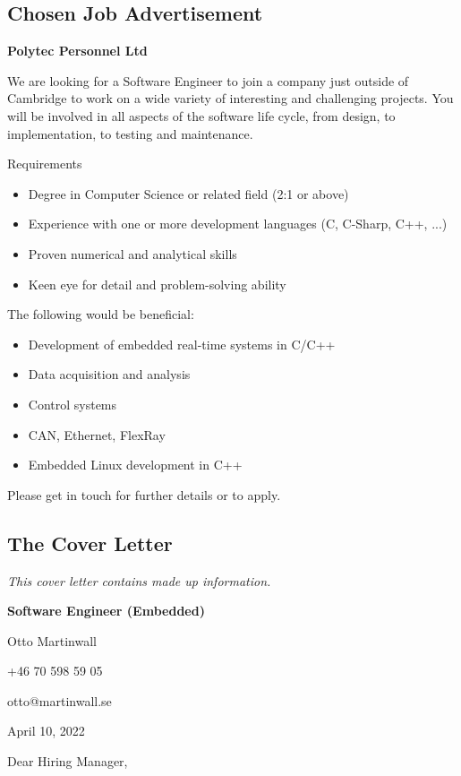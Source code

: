 \subsection{Chosen Job Advertisement}

\textbf{Polytec Personnel Ltd}

We are looking for a Software Engineer to join a company just outside of Cambridge to work on a wide variety of interesting and challenging projects. You will be involved in all aspects of the software life cycle, from design, to implementation, to testing and maintenance.

Requirements

\begin{itemize}
	\item Degree in Computer Science or related field (2:1 or above)
	\item Experience with one or more development languages (C, C-Sharp, C++, ...)
	\item Proven numerical and analytical skills
	\item Keen eye for detail and problem-solving ability
\end{itemize}

The following would be beneficial: 

\begin{itemize}
	\item Development of embedded real-time systems in C/C++
	\item Data acquisition and analysis
	\item Control systems
	\item CAN, Ethernet, FlexRay
	\item Embedded Linux development in C++
\end{itemize}

Please get in touch for further details or to apply.

\subsection{The Cover Letter}

\textit{This cover letter contains made up information.}

\newpage
\textbf{Software Engineer (Embedded)}

Otto Martinwall

+46 70 598 59 05

otto@martinwall.se

April 10, 2022
\bigskip

Dear Hiring Manager,






































